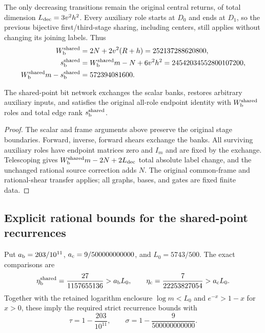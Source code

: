 The only decreasing transitions remain the original central returns, of total
dimension $L_{\rm dec}=3v^2h^2$. Every auxiliary role starts at $D_0$ and ends
at $D_1$, so the previous bijective first/third-stage sharing, including centers,
still applies without changing its joining labels. Thus
\begin{align*}
 W_{\rm b}^{\rm shared}&=2N+2v^2(R+h)=252137288620800,\\
 s_{\rm b}^{\rm shared}&=W_{\rm b}^{\rm shared}m-N+6v^2h^2
                         =24542034552800107200,\\
 W_{\rm b}^{\rm shared}m-s_{\rm b}^{\rm shared}&=572394081600.
\end{align*}
\begin{proposition}
\label{prop:shared-point-bit-interface}
The shared-point bit network exchanges the scalar banks, restores arbitrary
auxiliary inputs, and satisfies the original all-role endpoint identity with
$W_{\rm b}^{\rm shared}$ roles and total edge rank $s_{\rm b}^{\rm shared}$.
\end{proposition}
\begin{proof}
The scalar and frame arguments above preserve the original stage boundaries.
Forward, inverse, forward shears exchange the banks. All surviving auxiliary
roles have endpoint matrices zero and $I_m$ and are fixed by the exchange.
Telescoping gives $W_{\rm b}^{\rm shared}m-2N+2L_{\rm dec}$ total absolute
label change, and the unchanged rational source correction adds $N$.
The original common-frame and rational-shear transfer applies; all graphs,
bases, and gates are fixed finite data.
\end{proof}

\subsection{Explicit rational bounds for the shared-point recurrences}
Put $a_{\rm b}=203/10^{11}$, $a_{\rm c}=9/500000000000$, and $L_0=5743/500$.
The exact comparisons are
\[
 \eta_{\rm b}^{\rm shared}=\frac{27}{1157655136}>a_{\rm b}L_0,
 \qquad \eta_{\rm c}=\frac7{22253827054}>a_{\rm c}L_0.
\]
Together with the retained logarithm enclosure $\log m<L_0$ and
$e^{-x}>1-x$ for $x>0$, these imply the required strict recurrence bounds with
\begin{equation}\label{eq:explicit-motif-exponents}
 \tau=1-\frac{203}{10^{11}},\qquad \sigma=1-\frac9{500000000000}.
\end{equation}
